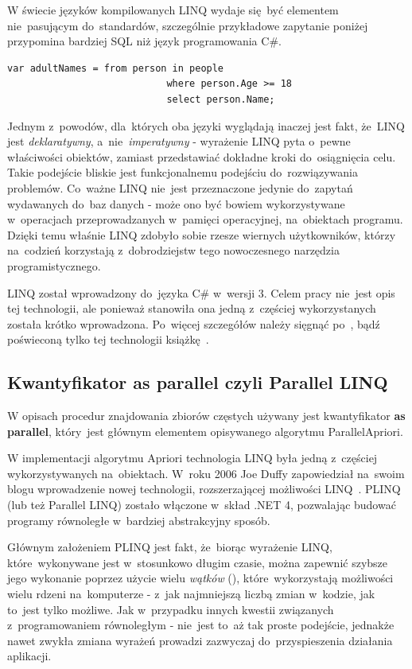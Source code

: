 W świecie języków kompilowanych LINQ wydaje się~być elementem nie~pasującym do~standardów, szczególnie przykładowe zapytanie poniżej przypomina bardziej SQL niż język programowania C\#. 

\begin{lstlisting}
var adultNames = from person in people
							where person.Age >= 18
							select person.Name;
\end{lstlisting}

Jednym z~powodów, dla~których oba języki wyglądają inaczej jest fakt, że~LINQ jest \emph{deklaratywny}, a~nie~\emph{imperatywny} - wyrażenie LINQ pyta o~pewne właściwości obiektów, zamiast przedstawiać dokładne kroki do~osiągnięcia celu. Takie podejście bliskie jest funkcjonalnemu podejściu do~rozwiązywania problemów. Co~ważne LINQ nie~jest przeznaczone jedynie do~zapytań wydawanych do~baz danych - może ono być bowiem wykorzystywane w~operacjach przeprowadzanych w~pamięci operacyjnej, na~obiektach programu. Dzięki temu właśnie LINQ zdobyło sobie rzesze wiernych użytkowników, którzy na~codzień korzystają z~dobrodziejstw tego nowoczesnego narzędzia programistycznego.

LINQ został wprowadzony do~języka C\# w~wersji 3. Celem pracy nie~jest opis tej technologii, ale ponieważ stanowiła ona jedną z~częściej wykorzystanych została krótko wprowadzona. Po~więcej szczegółów należy sięgnąć po~\cite{cSharp:inDepthS}, bądź poświeconą tylko tej technologii książkę~\cite{cSharp:linq}.

\subsection{Kwantyfikator as parallel czyli Parallel LINQ}\label{sec:asparallel}
W opisach procedur znajdowania zbiorów częstych używany jest kwantyfikator \textbf{as parallel}, który~jest głównym elementem opisywanego algorytmu ParallelApriori. 

W implementacji algorytmu Apriori technologia LINQ była jedną z~częściej wykorzystywanych na~obiektach. W~roku 2006 Joe Duffy zapowiedział na~swoim blogu wprowadzenie nowej technologii, rozszerzającej możliwości LINQ~\cite{cs:helloplinq}. PLINQ (lub też Parallel LINQ) zostało włączone w~skład .NET 4, pozwalając budować programy równoległe w~bardziej abstrakcyjny sposób. 

Głównym założeniem PLINQ jest fakt, że~biorąc wyrażenie LINQ, które~wykonywane jest w~stosunkowo długim czasie, można zapewnić szybsze jego wykonanie poprzez użycie wielu \emph{wątków} (), które~wykorzystają możliwości wielu rdzeni na~komputerze - z~jak najmniejszą liczbą zmian w~kodzie, jak to~jest tylko możliwe. Jak w~przypadku innych kwestii związanych z~programowaniem równoległym - nie~jest to~aż tak proste podejście, jednakże nawet zwykła zmiana wyrażeń prowadzi zazwyczaj do~przyspieszenia działania aplikacji.

